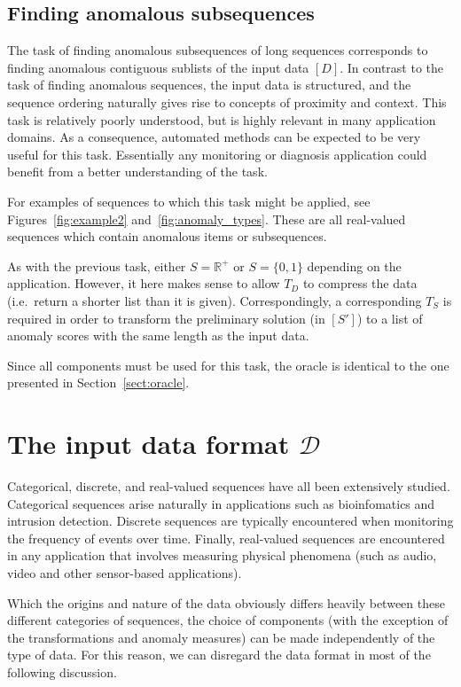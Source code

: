 \subsection{Finding anomalous subsequences}

The task of finding anomalous subsequences of long sequences corresponds to finding anomalous contiguous sublists of the input data $[D]$. In contrast to the task of finding anomalous sequences, the input data is structured, and the sequence ordering naturally gives rise to concepts of proximity and context. This task is relatively poorly understood, but is highly relevant in many application domains. As a consequence, automated methods can be expected to be very useful for this task. Essentially any monitoring or diagnosis application could benefit from a better understanding of the task.

For examples of sequences to which this task might be applied, see Figures~\ref{fig:example2} and~\ref{fig:anomaly_types}. These are all real-valued sequences which contain anomalous items or subsequences.

As with the previous task, either $S = \mathbb{R}^+$ or $S = \{0, 1\}$ depending on the application. However, it here makes sense to allow $T_D$ to compress the data (i.e.\ return a shorter list than it is given). Correspondingly, a corresponding $T_S$ is required in order to transform the preliminary solution (in $[S']$) to a list of anomaly scores with the same length as the input data.

Since all components must be used for this task, the oracle is identical to the one presented in Section~\ref{sect:oracle}.

\section{The input data format \texorpdfstring{$\mathcal{D}$}{D}}

Categorical, discrete, and real-valued sequences have all been extensively studied. Categorical sequences arise naturally in applications such as bioinfomatics and intrusion detection. Discrete sequences are typically encountered when monitoring the frequency of events over time. Finally, real-valued sequences are encountered in any application that involves measuring physical phenomena (such as audio, video and other sensor-based applications).

Which the origins and nature of the data obviously differs heavily between these different categories of sequences, the choice of components (with the exception of the transformations and anomaly measures) can be made independently of the type of data. For this reason, we can disregard the data format in most of the following discussion.

